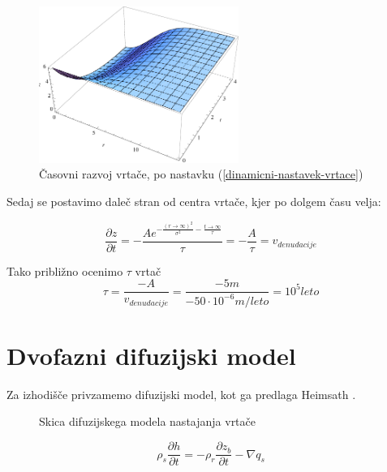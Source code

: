 \documentclass[a4paper, oneside, 12pt]{book}
\begin{document}
  \begin{figure}[H]
    \begin{center}
      \includegraphics[width=6.5cm]{slike/vrtaca-dinamicno}
    \end{center}
    \caption{Časovni razvoj vrtače, po nastavku (\ref{dinamicni-nastavek-vrtace})}
    \label{fig:vrtaca-dinamicno}
  \end{figure}

  Sedaj se postavimo daleč stran od centra vrtače, kjer po dolgem času velja:

  \begin{equation}
    \frac{\partial z}{\partial t} = -\frac{A e^{-\frac{(r \rightarrow \infty)^2}{\sigma ^2}-\frac{t \rightarrow \infty}{\tau }}}{\tau } = -\frac{A}{\tau} = v_{denudacije}
    \label{hitrost-denudacije}
  \end{equation}

  Tako približno ocenimo $\tau$ vrtač
  \begin{equation}
    \tau = \frac{-A}{v_{denudacije}}=\frac{-5m}{-50\cdot 10^{-6} m/leto} = 10^5 leto
    \label{tau-vrtace}
  \end{equation}

  \newpage

  \section{Dvofazni difuzijski model}

  Za izhodišče privzamemo difuzijski model, kot ga predlaga Heimsath \cite{Heimsath2001}.

  \begin{figure}[H]
    \centering
    
    \caption{Skica difuzijskega modela nastajanja vrtače}
    \label{fig:difuzijski-model}
  \end{figure}

  \begin{equation}
    \rho_s \frac{\partial h}{\partial t} = -\rho_r \frac{\partial z_b}{\partial t} - \nabla q_s
    \label{kontinuitetna-enacba-original}
  \end{equation}
\end{document}
